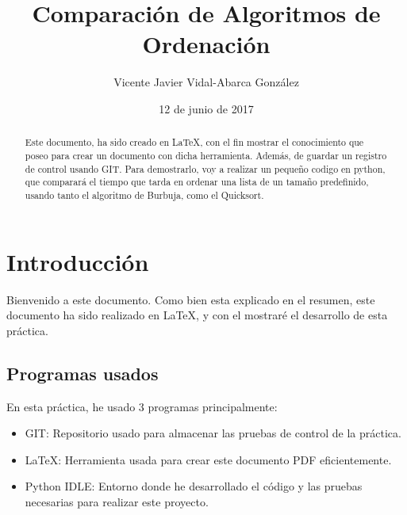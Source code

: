 \documentclass[a4,12pt]{article}
\title{Comparación de Algoritmos de Ordenación}
\author{Vicente Javier Vidal-Abarca González}
\date{12 de junio de 2017}
\begin{document}
\maketitle

\begin{abstract}

Este documento, ha sido creado en \LaTeX, con el fin mostrar el conocimiento que poseo para crear un documento con dicha herramienta. Además, de guardar un registro de control usando GIT. Para demostrarlo, voy a realizar un pequeño codigo en python, que comparará el tiempo que tarda en ordenar una lista de un tamaño predefinido, usando tanto el algoritmo de Burbuja, como el Quicksort.

\end{abstract}

\newpage
\tableofcontents
\newpage

\section{Introducción}
Bienvenido a este documento. Como bien esta explicado en el resumen, este documento ha sido realizado en \LaTeX, y con el mostraré el desarrollo de esta práctica.

\subsection{Programas usados}
En esta práctica, he usado 3 programas principalmente:
\begin{itemize}

\item GIT: Repositorio usado para almacenar las pruebas de control de la práctica.

\item \LaTeX: Herramienta usada para crear este documento PDF eficientemente.

\item Python IDLE: Entorno donde he desarrollado el código y las pruebas necesarias para realizar este proyecto.

\end{itemize}
\end{document}
